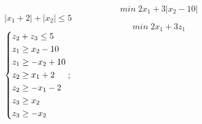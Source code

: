\documentclass{article}
\begin{document}
\begin{preview}
\begin{center}
                        \begin{equation*}
                                min \; 2 x_1 + 3 \left| x_2 - 10 \right|
                        \end{equation*}
                        \begin{math}
                                \left| x_1 + 2 \right| + \left| x_2 \right| \leq{5}
                        \end{math}
                        \begin{equation*}
                                min \; 2 x_1 + 3 z_1
                        \end{equation*}
                        \begin{math}
                                \begin{dcases}
                                        z_2 + z_3 \leq{5} \\
                                        z_1 \geq{ x_2 - 10 } \\
                                        z_1 \geq{ - x_2 + 10 } \\
                                        z_2 \geq{ x_1 + 2 } \\
                                        z_2 \geq{ - x_1 -2 } \\
                                        z_3 \geq{ x_2 } \\
                                        z_3 \geq{ - x_2 }
                                \end{dcases};
                        \end{math}


\end{center}
\end{preview}
\end{document}
